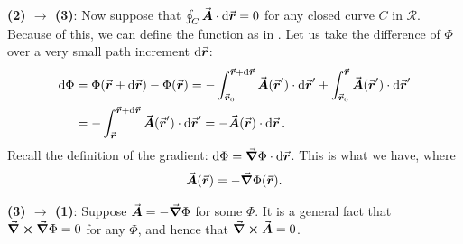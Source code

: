 \textbf{(2) $\rightarrow$ (3)}: Now suppose that $\oint_{C} \va*{A} \cdot \dd{\va*{r}} = 0$ for any closed curve $C$ in $\mathcal{R}$.
Because of this, we can define the function as in .
Let us take the difference of $\Phi$ over a very small path increment $\dd{\va*{r}}$:
\begin{align}
    \dd{\Phi} &= \Phi(\va*{r} + \dd{\va*{r}}) - \Phi(\va*{r}) = -\int_{\va*{r}_{0}}^{\va*{r} + \dd{\va*{r}}} \va*{A}(\va*{r}') \cdot \dd{\va*{r}'} + \int_{\va*{r}_{0}}^{\va*{r}} \va*{A}(\va*{r}') \cdot \dd{\va*{r}'} \\
              &= -\int_{\va*{r}}^{\va*{r} + \dd{\va*{r}}} \va*{A}(\va*{r}') \cdot \dd{\va*{r}'} = - \va*{A}(\va*{r}) \cdot \dd{\va*{r}}
.\end{align}
Recall the definition of the gradient: $\dd{\Phi} = \grad \Phi \cdot \dd{\va*{r}}$.
This is what we have, where
\begin{eqnarray}
    \va*{A}(\va*{r}) = - \grad \Phi(\va*{r})
.\end{eqnarray}

\textbf{(3) $\rightarrow$ (1)}: Suppose $\va*{A} = - \grad \Phi$ for some $\Phi$.
It is a general fact that $\curl{\grad \Phi} = 0$ for any $\Phi$, and hence that $\curl{\va*{A}} = 0$.